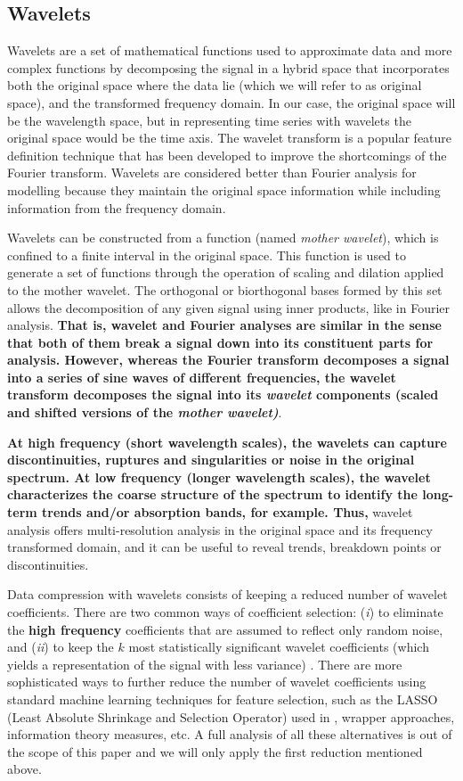 \documentclass[a4paper,fleqn,usenatbib]{mnras}
\begin{document}
{\subsection{Wavelets}

Wavelets \citep{mallat:98} are a set of mathematical functions used to
approximate data and more complex functions by decomposing the signal
in a hybrid space that incorporates both the original space where the
data lie (which we will refer to as original space), and the
transformed frequency domain. In our case, the original space will be
the wavelength space, but in representing time series with wavelets
the original space would be the time axis. The wavelet transform is a
popular feature definition technique that has been developed to
improve the shortcomings of the Fourier transform. Wavelets are
considered better than Fourier analysis for modelling because they
maintain the original space information while including information
from the frequency domain.

Wavelets can be constructed from a function (named \textit{mother 
wavelet}), which is confined to a finite interval in the original
space. This function is used to generate a set of functions through
the operation of scaling and dilation applied to the mother
wavelet. The orthogonal or biorthogonal bases formed by this set
allows the decomposition of any given signal using inner products,
like in Fourier analysis. {\bf That is, wavelet and Fourier analyses
are similar in the sense that both of them break a signal down into its 
constituent parts for analysis. However, whereas the Fourier transform 
decomposes a signal into a series of sine waves of different 
frequencies, the wavelet transform decomposes the signal into 
its \textit{wavelet} components (scaled and shifted versions of the \textit{mother 
wavelet)}}.

{\bf At high frequency (short wavelength scales), the wavelets can capture 
discontinuities, ruptures and singularities or noise in the original spectrum. 
At low frequency (longer wavelength scales), the wavelet characterizes the 
coarse structure of the spectrum to identify the long-term trends and/or 
absorption bands, for example. Thus,} wavelet analysis offers multi-resolution analysis 
in the original space and its frequency transformed domain, and it can be 
useful to reveal trends, breakdown points or discontinuities.

Data compression with wavelets consists of keeping a reduced
number of wavelet coefficients. There are two common ways of
coefficient selection: (\textit i) to eliminate the {\bf high frequency}
coefficients that are assumed to reflect only random noise, 
and (\textit {ii}) to keep the $k$ most statistically significant
wavelet coefficients (which yields a representation of the signal with
less variance) \citep{li:10}. There are more sophisticated ways to
further reduce the number of wavelet coefficients using standard machine
learning techniques for feature selection, such as the LASSO
(Least Absolute Shrinkage and Selection Operator) used in
\cite{2015MNRAS.452.1394L}, wrapper approaches, information theory
measures, etc. A full analysis of all these alternatives is out of
the scope of this paper and we will only apply the first reduction
mentioned above.

}
\end{document}
